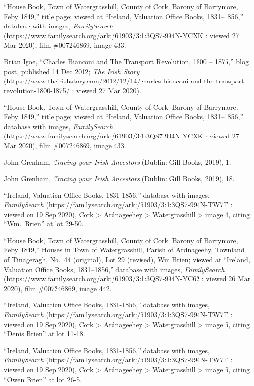 {{\begin{thebibliography}{999}
``House Book, Town of Watergrasshill, County of Cork, Barony of Barrymore, Feby 1849,'' title page; viewed at ``Ireland, Valuation Office Books, 1831--1856,'' database with images, \textit{FamilySearch} (\url{https://www.familysearch.org/ark:/61903/3:1:3QS7-994N-YCXK} : viewed 27 Mar 2020), film \#007246869, image 433.

Brian Igoe, ``Charles Bianconi and The Transport Revolution, 1800 -- 1875,'' blog post, published 14 Dec 2012; \textit{The Irish Story} (\url{https://www.theirishstory.com/2012/12/14/charles-bianconi-and-the-transport-revolution-1800-1875/} : viewed 27 Mar 2020).

``House Book, Town of Watergrasshill, County of Cork, Barony of Barrymore, Feby 1849,'' title page; viewed at ``Ireland, Valuation Office Books, 1831--1856,'' database with images, \textit{FamilySearch} (\url{https://www.familysearch.org/ark:/61903/3:1:3QS7-994N-YCXK} : viewed 27 Mar 2020), film \#007246869, image 433.

John Grenham, \textit{Tracing your Irish Ancestors} (Dublin: Gill Books, 2019), 1.

John Grenham, \textit{Tracing your Irish Ancestors} (Dublin: Gill Books, 2019), 18.

``Ireland, Valuation Office Books, 1831-1856,'' database with images, \textit{FamilySearch} (\url{https://familysearch.org/ark:/61903/3:1:3QS7-994N-TW7T} : viewed on 19 Sep 2020), Cork > Ardnageehey > Watergrasshill > image 4, citing ``Wm.\ Brien'' at lot 29-50.

``House Book, Town of Watergrasshill, County of Cork, Barony of Barrymore, Feby 1849,'' Houses in Town of Watergrasshill, Parish of Ardnageehy, Townland of Tinageragh, No.\ 44 (original), Lot 29 (revised), Wm Brien; viewed at ``Ireland, Valuation Office Books, 1831--1856,'' database with images, \textit{FamilySearch} (\url{https://www.familysearch.org/ark:/61903/3:1:3QS7-994N-YC62} : viewed 26 Mar 2020), film \#007246869, image 442.

``Ireland, Valuation Office Books, 1831-1856,'' database with images, \textit{FamilySearch} (\url{https://familysearch.org/ark:/61903/3:1:3QS7-994N-TW7T} : viewed on 19 Sep 2020), Cork > Ardnageehey > Watergrasshill > image 6, citing ``Denis Brien'' at lot 11-18.

``Ireland, Valuation Office Books, 1831-1856,'' database with images, \textit{FamilySearch} (\url{https://familysearch.org/ark:/61903/3:1:3QS7-994N-TW7T} : viewed on 19 Sep 2020), Cork > Ardnageehey > Watergrasshill > image 6, citing ``Owen Brien'' at lot 26-5.


\end{thebibliography}}}
